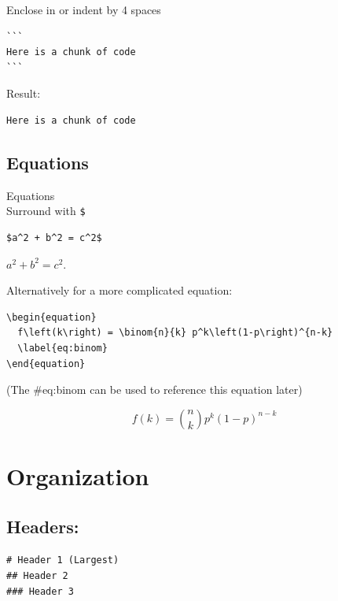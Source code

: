\documentclass[
]{book}
\begin{document}
Enclose in \texttt{\textasciigrave{}\textasciigrave{}\textasciigrave{}} or indent by 4 spaces

\begin{verbatim}
``` 
Here is a chunk of code 
```    
\end{verbatim}

Result:

\begin{verbatim}
Here is a chunk of code
\end{verbatim}

\hypertarget{equations}{%
\subsection{Equations}\label{equations}}

Equations\\
Surround with \texttt{\$}

\begin{verbatim}
$a^2 + b^2 = c^2$  
\end{verbatim}

\(a^2 + b^2 = c^2\).

Alternatively for a more complicated equation:

\begin{verbatim}
\begin{equation} 
  f\left(k\right) = \binom{n}{k} p^k\left(1-p\right)^{n-k}
  \label{eq:binom}
\end{equation} 
\end{verbatim}

(The \#eq:binom can be used to reference this equation later)

\begin{equation} 
  f\left(k\right) = \binom{n}{k} p^k\left(1-p\right)^{n-k}
  \label{eq:binom}
\end{equation}

\hypertarget{organization}{%
\section{Organization}\label{organization}}

\hypertarget{headers}{%
\subsection{Headers:}\label{headers}}

\texttt{\#\ Header\ 1\ (Largest)}~\\
\texttt{\#\#\ Header\ 2}~\\
\texttt{\#\#\#\ Header\ 3}
\end{document}
